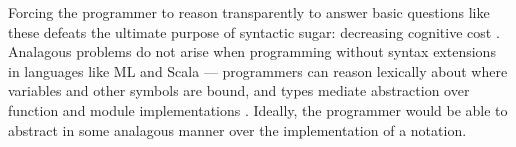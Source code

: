 \documentclass[acmsmall,review,anonymous]{acmart}\settopmatter{printfolios=true,printccs=false,printacmref=false}
\begin{document}
Forcing the programmer to reason transparently to answer basic questions like these defeats the ultimate purpose of syntactic sugar: decreasing cognitive cost \cite{Green89}. Analagous problems do not arise when programming without syntax extensions in languages like ML and Scala --- programmers can reason lexically about where variables and other symbols are bound, and types mediate abstraction over function and module implementations \cite{B304}. Ideally, the programmer would be able to abstract in some analagous manner over the implementation of a notation. %
\end{document}
